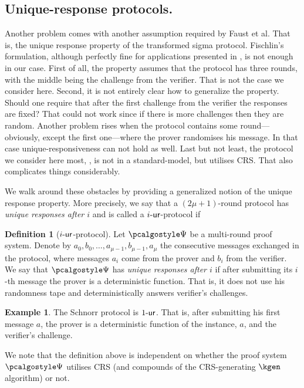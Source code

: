 \documentclass[runningheads,11pt]{llncs}
\theoremstyle{definition}
\newtheorem{definition}[theorem]{Definition}
\newtheorem{example}[theorem]{Example}
\begin{document}
\subsection{Unique-response protocols.}
Another problem comes with another assumption required by Faust et al. That is, the unique response property of the transformed sigma protocol.
Fischlin's formulation, although perfectly fine for applications presented in \cite{C:Fischlin05}, is not enough in our case.
First of all, the property assumes that the protocol has three rounds, with the middle being the challenge from the verifier. That is not the case we consider here. Second, it is not entirely clear how to generalize the property. Should one require that after the first challenge from the verifier the responses are fixed? That could not work since if there is more challenges then they are random.
Another problem rises when the protocol contains some round---obviously, except the first one---where the prover randomises his message. In that case unique-responsiveness can not hold as well.
Last but not least, the protocol we consider here most, \plonk, is not in a standard-model, but utilises CRS. That also complicates things considerably.

We walk around these obstacles by providing a generalized notion of the unique response property.
More precisely, we say that a $(2\mu + 1)$-round protocol has \emph{unique responses after $i$} and is called a ${i\text{-}\mathsf{ur}}$-protocol if
\begin{definition}[${i\text{-}\mathsf{ur}}$-protocol]
	\label{def:wiur}
	Let $\proofsystem$ be a multi-round proof system.
	Denote by $a_0, b_0, \ldots, a_{\mu - 1}, b_{\mu - 1}, a_{\mu}$ the consecutive messages exchanged in the protocol, where messages $a_i$ come from the prover and $b_i$ from the verifier.
	We say that $\proofsystem$ has \emph{unique responses after $i$}
	if after submitting its $i$-th message the prover is a deterministic function. That is, it does not use his randomness tape and deterministically answers verifier's challenges.
\end{definition}
\begin{example}
	The Schnorr protocol is ${1\text{-}\mathsf{ur}}$. That is, after submitting his first message $a$, the prover is a deterministic function of the instance, $a$, and the verifier's challenge.
\end{example}

We note that the definition above is independent on whether the proof system $\proofsystem$ utilises CRS (and compounds of the CRS-generating $\kgen$ algorithm) or not.
\end{document}
